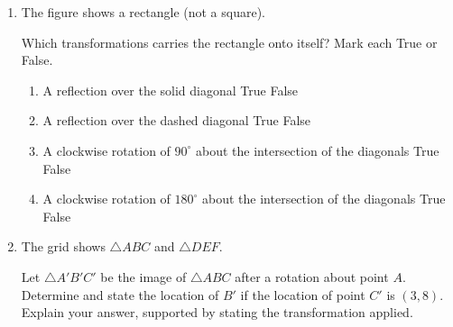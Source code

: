 \documentclass[12pt, twoside]{article}
\begin{document}
\begin{enumerate}
\newpage
 \item The figure shows a rectangle (not a square).
   \begin{center}
   \end{center}
   Which transformations carries the rectangle onto itself? Mark each True or False.
     \begin{enumerate}
       \item A reflection over the solid diagonal \hfill True \quad False
       \item A reflection over the dashed diagonal \hfill True \quad False
       \item A clockwise rotation of $90^\circ$ about the intersection of the diagonals \hfill True \quad False
       \item A clockwise rotation of $180^\circ$ about the intersection of the diagonals \hfill True \quad False
     \end{enumerate}
     \vspace{1cm}

   \item The grid shows $\triangle ABC$ and $\triangle DEF$.
     \begin{center}
     \end{center}
     Let $\triangle A'B'C'$ be the image of $\triangle ABC$ after a rotation about point $A$. Determine and state the location of $B'$ if the location of point $C'$ is $(3,8)$. Explain your answer, supported by stating the transformation applied.


\end{enumerate}
\end{document}
